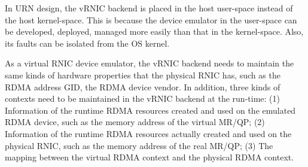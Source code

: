 In URN design, the vRNIC backend is placed in the host user-space instead of the host kernel-space. This is because the device emulator in the user-space can be developed, deployed, managed more easily than that in the kernel-space. Also, its faults can be isolated from the OS kernel.

As a virtual RNIC device emulator, the vRNIC backend needs to maintain the same kinds of hardware properties that the physical RNIC has, such as the RDMA address GID, the RDMA device vendor. In addition, three kinds of contexts need to be maintained in the vRNIC backend at the run-time:
(1) Information of the runtime RDMA resources created and used on the emulated RDMA device, such as the memory address of the virtual MR/QP;
(2) Information of the runtime RDMA resources actually created and used on the physical RNIC,  such as the memory address of the real MR/QP;
(3) The mapping between the virtual RDMA context and the physical RDMA context.

